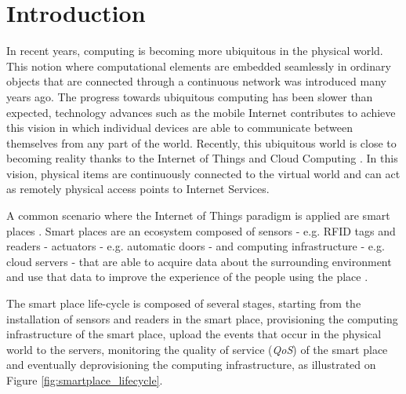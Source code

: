 \section{Introduction}
\label{sec:introduction}
In recent years, computing is becoming more ubiquitous in the physical world. This
notion where computational elements are embedded seamlessly in ordinary objects that
are connected through a continuous network was introduced many years ago\cite{weiser1991computer}.
The progress towards ubiquitous computing has been slower than expected, technology advances such
as the mobile Internet contributes to achieve this vision in which individual devices are
able to communicate between themselves from any part of the world\cite{gubbi2013internet}. Recently,
this ubiquitous world is close to becoming reality thanks to the Internet of Things and Cloud Computing
\cite{caceres2012ubicomp}. In this vision, physical items are continuously connected to the virtual
world and can act as remotely physical access points to Internet Services\cite{mattern2010internet}.

A common scenario where the Internet of Things paradigm is applied are smart places \cite{atzori2010internet}.
Smart places are an ecosystem composed of sensors - e.g. RFID tags and readers - actuators - e.g. automatic doors -
and computing infrastructure - e.g. cloud servers - that are able to acquire data about the surrounding
environment and use that data to improve the experience of the people using the place \cite{cook2004smart}.

The smart place life-cycle is composed of several stages, starting from the installation of sensors and
readers in the smart place, provisioning the computing infrastructure of the smart place, upload the events
that occur in the physical world to the servers, monitoring the quality of service (\textit{QoS}) of the smart
place and eventually deprovisioning the computing infrastructure, as illustrated on Figure
\ref{fig:smartplace_lifecycle}.

